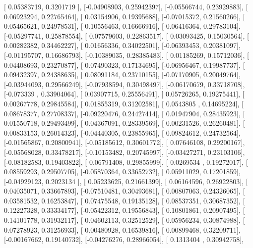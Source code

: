 \documentclass{article}
\begin{document}
       [ 0.05383719,  0.3201719 ],
       [-0.04908903,  0.25942397],
       [-0.05566744,  0.23929883],
       [ 0.06923294,  0.22765464],
       [ 0.03154906,  0.19395688],
       [-0.07015372,  0.21560266],
       [ 0.05465621,  0.24978531],
       [-0.10556463,  0.16666916],
       [-0.06416364,  0.29783104],
       [-0.05297741,  0.25878554],
       [ 0.07579603,  0.22863517],
       [ 0.03093425,  0.15030564],
       [ 0.00282382,  0.34462227],
       [ 0.01656336,  0.34022501],
       [-0.06393453,  0.20381097],
       [-0.01195707,  0.16686793],
       [-0.10389035,  0.28385483],
       [ 0.01185269,  0.15712036],
       [ 0.04408693,  0.23270877],
       [ 0.07490323,  0.17134695],
       [-0.06956467,  0.19987737],
       [ 0.09432397,  0.24388635],
       [ 0.08091184,  0.23710155],
       [-0.07170905,  0.20049764],
       [-0.03944093,  0.29566249],
       [-0.07938594,  0.30498497],
       [-0.06170679,  0.33718708],
       [-0.073339  ,  0.33904064],
       [ 0.03907715,  0.25556491],
       [ 0.05726265,  0.19275441],
       [ 0.00267778,  0.29845584],
       [ 0.01855319,  0.31202581],
       [ 0.0543805 ,  0.14695224],
       [ 0.08678377,  0.27708337],
       [-0.09220476,  0.24427414],
       [ 0.01947904,  0.28435923],
       [ 0.01550718,  0.29493499],
       [-0.04367091,  0.28339569],
       [ 0.00231526,  0.26260481],
       [ 0.00833153,  0.26014323],
       [-0.04440305,  0.23855965],
       [ 0.09824612,  0.24732564],
       [-0.01565867,  0.20800941],
       [-0.05185612,  0.30601772],
       [ 0.07646108,  0.29200167],
       [-0.05568028,  0.33478217],
       [-0.10153482,  0.20745997],
       [-0.03427271,  0.23103106],
       [-0.08182583,  0.19403822],
       [ 0.06791408,  0.29855999],
       [ 0.0269534 ,  0.19272017],
       [ 0.08559293,  0.29507705],
       [-0.05870364,  0.33652732],
       [ 0.05911029,  0.17201859],
       [-0.04929123,  0.2023134 ],
       [ 0.05233625,  0.21661399],
       [ 0.06164596,  0.26922803],
       [ 0.04035071,  0.33667893],
       [-0.07510481,  0.30493681],
       [ 0.00807063,  0.24326065],
       [ 0.03581532,  0.16253847],
       [ 0.07475548,  0.19135128],
       [ 0.08537351,  0.30687352],
       [ 0.12227328,  0.33334177],
       [-0.05422312,  0.19556843],
       [ 0.10801861,  0.20907495],
       [ 0.14101778,  0.31932117],
       [-0.04602113,  0.32512529],
       [-0.05956234,  0.30874988],
       [ 0.07278923,  0.31256933],
       [ 0.00480928,  0.16539816],
       [ 0.00899468,  0.32209711],
       [-0.00167662,  0.19140732],
       [-0.04276276,  0.28966054],
       [ 0.1313404 ,  0.30942758],
\end{document}
